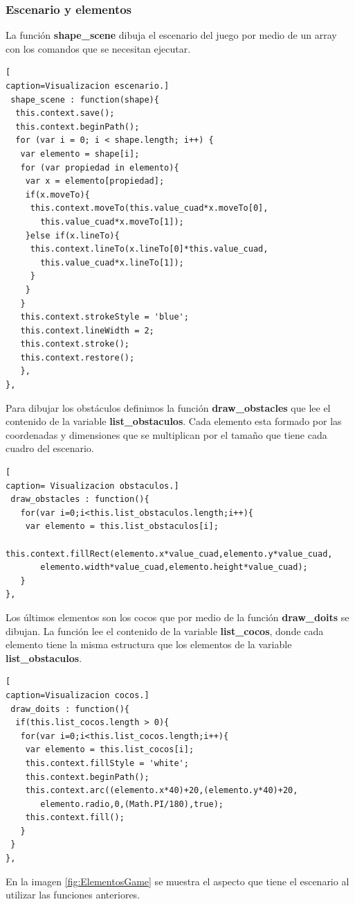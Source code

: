 \subsubsection*{Escenario y elementos}
La función \textbf{shape\_scene} dibuja el escenario del juego por medio de un array con los comandos que se necesitan ejecutar.
\begin{lstlisting}[
caption=Visualizacion escenario.]
 shape_scene : function(shape){
  this.context.save();
  this.context.beginPath();
  for (var i = 0; i < shape.length; i++) {
   var elemento = shape[i];
   for (var propiedad in elemento){
    var x = elemento[propiedad];
    if(x.moveTo){
     this.context.moveTo(this.value_cuad*x.moveTo[0],
       this.value_cuad*x.moveTo[1]);
    }else if(x.lineTo){
     this.context.lineTo(x.lineTo[0]*this.value_cuad,
       this.value_cuad*x.lineTo[1]);
     }
    }
   }
   this.context.strokeStyle = 'blue';
   this.context.lineWidth = 2;
   this.context.stroke();
   this.context.restore();
   },
},
\end{lstlisting}
Para dibujar los obstáculos definimos la función \textbf{draw\_obstacles} que lee el contenido de la variable \textbf{list\_obstaculos}. Cada elemento esta formado por las coordenadas y dimensiones que se multiplican por el tamaño que tiene cada cuadro del escenario.
\begin{lstlisting}[
caption= Visualizacion obstaculos.]
 draw_obstacles : function(){
   for(var i=0;i<this.list_obstaculos.length;i++){
    var elemento = this.list_obstaculos[i]; 
     this.context.fillRect(elemento.x*value_cuad,elemento.y*value_cuad,
       elemento.width*value_cuad,elemento.height*value_cuad);
   }
},
\end{lstlisting}
Los últimos elementos son los cocos que por medio de la función \textbf{ draw\_doits} se dibujan. La función lee el contenido de la variable \textbf{list\_cocos}, donde cada elemento tiene la misma estructura que los elementos de la variable \textbf{list\_obstaculos}.
\begin{lstlisting}[
caption=Visualizacion cocos.]
 draw_doits : function(){
  if(this.list_cocos.length > 0){ 
   for(var i=0;i<this.list_cocos.length;i++){ 
    var elemento = this.list_cocos[i]; 
    this.context.fillStyle = 'white'; 
    this.context.beginPath(); 
    this.context.arc((elemento.x*40)+20,(elemento.y*40)+20,
       elemento.radio,0,(Math.PI/180),true);
    this.context.fill();
   }
 }
},
\end{lstlisting}
En la imagen \ref{fig:ElementosGame} se muestra el aspecto que tiene el escenario al utilizar las funciones anteriores.

